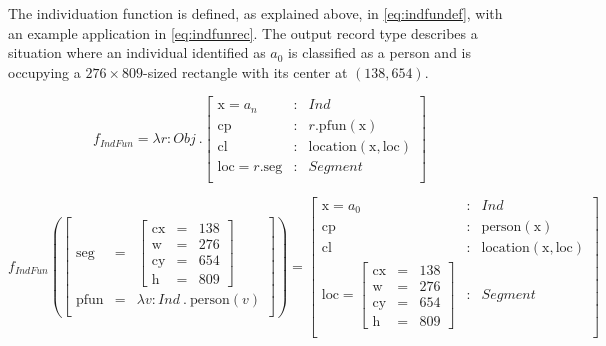 
The individuation function is defined, as explained above, in \autoref{eq:indfundef}, with an example application in \autoref{eq:indfunrec}.
The output record type describes a situation where an individual identified as $a_0$ is classified as a person and is occupying a $276 \times 809$-sized rectangle with its center at $(138, 654)$.

\begin{equation}\label{eq:indfundef}
f_{IndFun} = \lambda r : Obj\ . \left[\begin{array}{lcl}
    \text{x} = a_n &:& Ind \\
    \text{cp} &:& r.\text{pfun}(\text{x}) \\
    \text{cl} &:& \text{location}(\text{x}, \text{loc}) \\
    \text{loc} = r.\text{seg} &:& Segment\\
\end{array}\right]
\end{equation}

\begin{equation}\label{eq:indfunrec}
f_{IndFun}(
\left[\begin{array}{rcl}
\text{seg} &=& \left[\begin{array}{rcl}
\text{cx} &=& 138\\
\text{w} &=& 276\\
\text{cy} &=& 654\\
\text{h} &=& 809
\end{array}\right]\\
\text{pfun} &=& \lambda v:Ind\ .\ \text{person}(v)\\
\end{array}\right]
) =
\left[\begin{array}{lcl}
    \text{x} = a_0 &:& Ind \\
    \text{cp} &:& \text{person}(\text{x}) \\
    \text{cl} &:& \text{location}(\text{x}, \text{loc}) \\
    \text{loc} = \left[\begin{array}{rcl}
		\text{cx} &=& 138\\
		\text{w} &=& 276\\
		\text{cy} &=& 654\\
		\text{h} &=& 809
		\end{array}\right] &:& Segment\\
\end{array}\right]
\end{equation}



